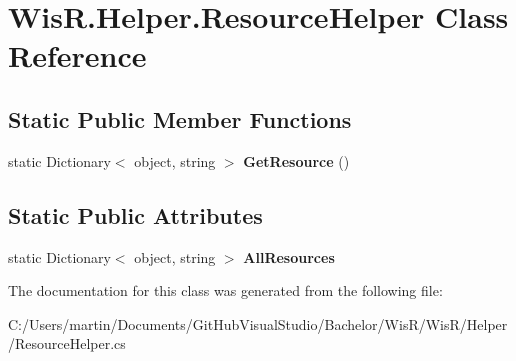 \hypertarget{class_wis_r_1_1_helper_1_1_resource_helper}{}\section{Wis\+R.\+Helper.\+Resource\+Helper Class Reference}
\label{class_wis_r_1_1_helper_1_1_resource_helper}
\subsection*{Static Public Member Functions}
\begin{DoxyCompactItemize}
\item 
\hypertarget{class_wis_r_1_1_helper_1_1_resource_helper_aea87d8e60991f9a6c7896dc84a4d81e8}{}static Dictionary$<$ object, string $>$ {\bfseries Get\+Resource} ()\label{class_wis_r_1_1_helper_1_1_resource_helper_aea87d8e60991f9a6c7896dc84a4d81e8}

\end{DoxyCompactItemize}
\subsection*{Static Public Attributes}
\begin{DoxyCompactItemize}
\item 
\hypertarget{class_wis_r_1_1_helper_1_1_resource_helper_a83ae2349d3a98b5ef20f10432b660909}{}static Dictionary$<$ object, string $>$ {\bfseries All\+Resources}\label{class_wis_r_1_1_helper_1_1_resource_helper_a83ae2349d3a98b5ef20f10432b660909}

\end{DoxyCompactItemize}


The documentation for this class was generated from the following file\+:\begin{DoxyCompactItemize}
\item 
C\+:/\+Users/martin/\+Documents/\+Git\+Hub\+Visual\+Studio/\+Bachelor/\+Wis\+R/\+Wis\+R/\+Helper/Resource\+Helper.\+cs\end{DoxyCompactItemize}
